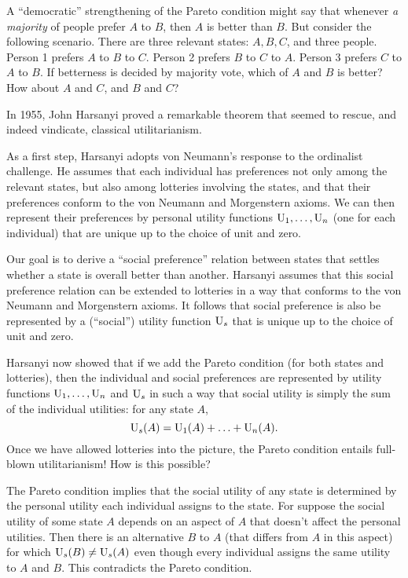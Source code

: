 \begin{exercise}{1}
  A ``democratic'' strengthening of the Pareto condition might say that whenever
  \emph{a majority} of people prefer $A$ to $B$, then $A$ is better than $B$.
  But consider the following scenario. There are three relevant states: $A,B,C$,
  and three people. Person 1 prefers $A$ to $B$ to $C$. Person 2 prefers $B$ to
  $C$ to $A$. Person 3 prefers $C$ to $A$ to $B$. If betterness is decided by
  majority vote, which of $A$ and $B$ is better? How about $A$ and $C$, and $B$
  and $C$?
\end{exercise}

In 1955, John Harsanyi proved a remarkable theorem that seemed to rescue, and
indeed vindicate, classical utilitarianism.

As a first step, Harsanyi adopts von Neumann's response to the ordinalist
challenge. He assumes that each individual has preferences not only among the
relevant states, but also among lotteries involving the states, and that their
preferences conform to the von Neumann and Morgenstern axioms. We can then
represent their preferences by personal utility functions $\text{U}_{1},\ldots,\text{U}_{n}$
(one for each individual) that are unique up to the choice of unit and zero.

Our goal is to derive a ``social preference'' relation between states that
settles whether a state is overall better than another. Harsanyi assumes that
this social preference relation can be extended to lotteries in a way that
conforms to the von Neumann and Morgenstern axioms. It follows that social
preference is also be represented by a (``social'') utility function $\text{U}_{s}$
that is unique up to the choice of unit and zero.

Harsanyi now showed that if we add the Pareto condition (for both states and
lotteries), then the individual and social preferences are represented by
utility functions $\text{U}_1,\ldots,\text{U}_n$ and $\text{U}_s$ in such a way that social
utility is simply the sum of the individual utilities: for any state $A$,
\[
  \text{U}_s(A) = \text{U}_1(A) + \ldots + \text{U}_n(A).
\]
Once we have allowed lotteries into the picture, the Pareto condition entails
full-blown utilitarianism! How is this possible?

The Pareto condition implies that the social utility of any state is determined
by the personal utility each individual assigns to the state. For suppose the
social utility of some state $A$ depends on an aspect of $A$ that doesn't affect
the personal utilities. Then there is an alternative $B$ to $A$ (that differs
from $A$ in this aspect) for which $\text{U}_{s}(B) \not= \text{U}_{s}(A)$ even though every
individual assigns the same utility to $A$ and $B$. This contradicts the Pareto
condition.

